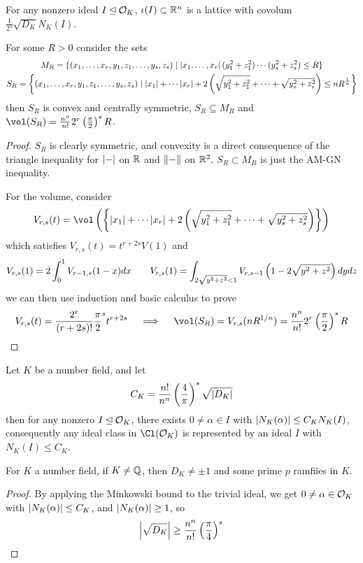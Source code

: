 \documentclass{article}
\begin{document}
\begin{corollary}
    For any nonzero ideal $I\unlhd \mathcal{O}_K$, $\iota(I)\subset \mathbb{R}^n$ is a lattice with covolum $\frac{1}{2^s}\sqrt{D_K}N_K(I)$.
\end{corollary}

\begin{proposition}
    For some $R>0$ consider the sets \begin{gather*}
        M_R = \{(x_1,\ldots,x_r,y_1,z_1,\ldots,y_s,z_s) \mid \left| x_1,\ldots,x_r \right|(y_1^2+z_1^2)\cdots(y_s^2+z_s^2) \leq R\} \\
        S_R = \left\{(x_1,\ldots,x_r,y_1,z_1,\ldots,y_s,z_s) \mid \left| x_1 \right| + \cdots \left| x_r \right| + 2\left( \sqrt{y_1^2+z_1^2} + \cdots + \sqrt{y_s^2+z_s^2} \right) \leq nR^{\frac{1}{n}}\right\}
    \end{gather*} then $S_R$ is convex and centrally symmetric, $S_R\subseteq M_R$ and $\vol(S_R) = \frac{n^n}{n!}2^r\pr{\frac{\pi}{2}}^sR$.\begin{proof}
        $S_R$ is clearly symmetric, and convexity is a direct consequence of the triangle inequality for $\left| - \right|$ on $\mathbb{R}$ and $\left\lVert - \right\rVert$ on $\mathbb{R}^2$. $S_R\subset M_R$ is just the AM-GN inequality.

        For the volume, consider \[
        V_{r,s}(t) = \vol\pr{\left\{\abs{x_1}+\cdots \abs{x_r} + 2\pr{\sqrt{y_1^2+z_1^2} + \cdots + \sqrt{y_s^2 + z_s^2}}\right\}}
        \] which satisfies $V_{r,s}(t) = t^{r+2s}V(1)$ and \[
        V_{r,s}(1) = 2\int_0^1 V_{r-1,s}(1-x)dx \qquad V_{r,s}(1) = \int_{2\sqrt{y^2+z^2}<1}V_{r,s-1}\left( 1-2\sqrt{y^2+z^2} \right)dydz
        \] we can then use induction and basic calculus to prove \[
        V_{r,s}(t) = \frac{2^r}{(r+2s)!}\frac{\pi}{2}^s t^{r+2s} \quad \implies \quad \vol(S_R) = V_{r,s}(nR^{1/n}) = \frac{n^n}{n!}2^r\pr{\frac{\pi}{2}}^sR\qedhere
        \] 
    \end{proof}
\end{proposition}

\begin{theorem}
    Let $K$ be a number field, and let \[
    C_K = \frac{n!}{n^n}\left( \frac{4}{\pi} \right)^s\sqrt{\left| D_K \right|}
    \] then for any nonzero $I\unlhd \mathcal{O}_K$, there exists $0\neq \alpha \in I$ with $\left| N_K(\alpha) \right|\leq C_KN_K(I)$, consequently any ideal class in $\Cl(\cO_K)$ is represented by an ideal $I$ with $N_K(I)\leq C_K$.
\end{theorem}

\begin{corollary}
    For $K$ a number field, if $K\neq \mathbb{Q}$, then $D_K\neq \pm 1$ and some prime $p$ ramfiies in $K$.\begin{proof}
        By applying the Minkowski bound to the trivial ideal, we get $0\neq\alpha \in \mathcal{O}_K$ with $\left| N_K(\alpha) \right|\leq C_K$, and $\left| N_K(\alpha) \right|\geq 1$, so \[\left| \sqrt{D_K} \right|\geq \frac{n^n}{n!}\left( \frac{\pi}{4} \right)^s\qedhere\]
    \end{proof}
\end{corollary}
\end{document}
